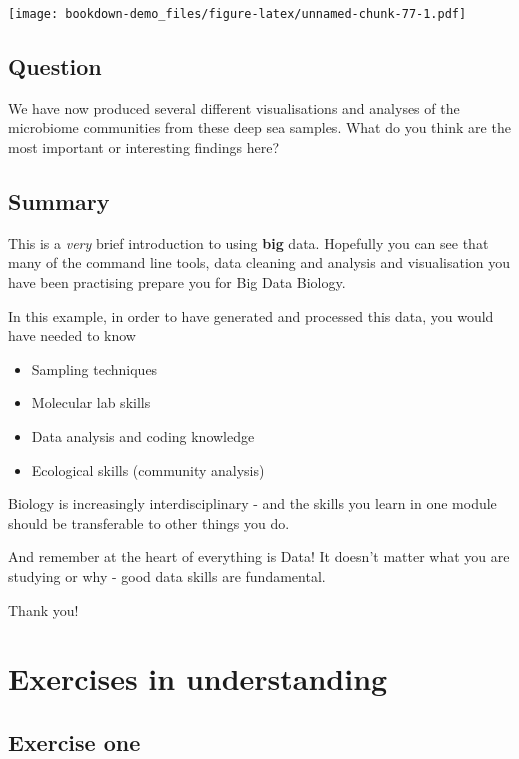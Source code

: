 \documentclass[
]{book}
\providecommand{\tightlist}{%
  \setlength{\itemsep}{0pt}\setlength{\parskip}{0pt}}
\begin{document}
\texttt{[image: bookdown-demo\_files/figure-latex/unnamed-chunk-77-1.pdf]}

\hypertarget{question}{%
\section{Question}\label{question}}

We have now produced several different visualisations and analyses of the microbiome communities from these deep sea samples.
What do you think are the most important or interesting findings here?

\hypertarget{summary-3}{%
\section{Summary}\label{summary-3}}

This is a \emph{very} brief introduction to using \textbf{big} data. Hopefully you can see that many of the command line tools, data cleaning and analysis and visualisation you have been practising prepare you for Big Data Biology.

In this example, in order to have generated and processed this data, you would have needed to know

\begin{itemize}
\tightlist
\item
  Sampling techniques
\item
  Molecular lab skills
\item
  Data analysis and coding knowledge
\item
  Ecological skills (community analysis)
\end{itemize}

Biology is increasingly interdisciplinary - and the skills you learn in one module should be transferable to other things you do.

And remember at the heart of everything is Data! It doesn't matter what you are studying or why - good data skills are fundamental.

Thank you!

\hypertarget{exercises-in-understanding}{%
\chapter{Exercises in understanding}\label{exercises-in-understanding}}

\hypertarget{exercise-one}{%
\section{Exercise one}\label{exercise-one}}
\end{document}
